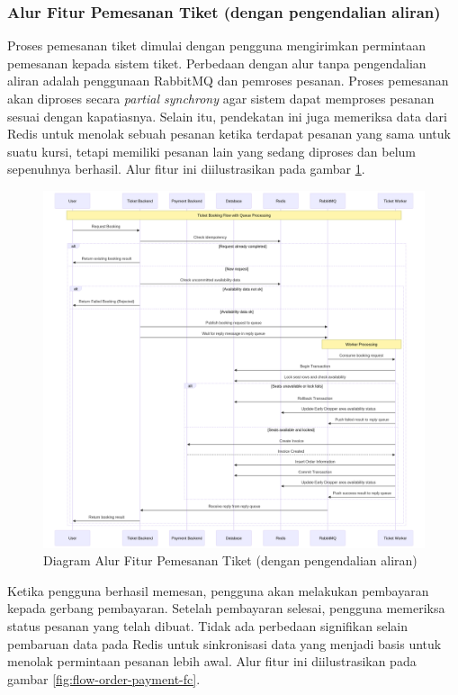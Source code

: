 \pagebreak

\subsubsection{Alur Fitur Pemesanan Tiket (dengan pengendalian aliran)}

Proses pemesanan tiket dimulai dengan pengguna mengirimkan permintaan pemesanan kepada sistem tiket. Perbedaan dengan alur tanpa pengendalian aliran adalah penggunaan RabbitMQ dan pemroses pesanan. Proses pemesanan akan diproses secara \textit{partial synchrony} agar sistem dapat memproses pesanan sesuai dengan kapatiasnya. Selain itu, pendekatan ini juga memeriksa data dari Redis untuk menolak sebuah pesanan ketika terdapat pesanan yang sama untuk suatu kursi, tetapi memiliki pesanan lain yang sedang diproses dan belum sepenuhnya berhasil. Alur fitur ini diilustrasikan pada gambar \ref{fig:flow-book-fc}.

\begin{figure}[h]
    \centering
    \includegraphics[width=1\textwidth]{resources/chapter-3/book-async.png}
    \caption{Diagram Alur Fitur Pemesanan Tiket (dengan pengendalian aliran)}
    \label{fig:flow-book-fc}
\end{figure}

\pagebreak

Ketika pengguna berhasil memesan, pengguna akan melakukan pembayaran kepada gerbang pembayaran. Setelah pembayaran selesai, pengguna memeriksa status pesanan yang telah dibuat. Tidak ada perbedaan signifikan selain pembaruan data pada Redis untuk sinkronisasi data yang menjadi basis untuk menolak permintaan pesanan lebih awal. Alur fitur ini diilustrasikan pada gambar \ref{fig:flow-order-payment-fc}.

